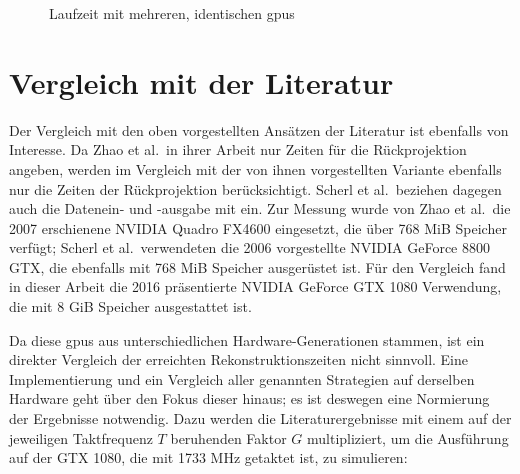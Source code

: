 \begin{figure}
    \centering
    \caption{Laufzeit mit mehreren, identischen \gls{gpu}s}
    \label{fig:laufzeit_gpus_homogen}
\end{figure}


\section{Vergleich mit der Literatur}

Der Vergleich mit den oben vorgestellten Ansätzen der Literatur ist ebenfalls von Interesse. Da Zhao et al.\ in ihrer
Arbeit nur Zeiten für die Rückprojektion angeben, werden im Vergleich mit der von ihnen vorgestellten Variante ebenfalls
nur die Zeiten der Rückprojektion berücksichtigt. Scherl et al.\ beziehen dagegen auch die Datenein- und -ausgabe mit
ein. Zur Messung wurde von Zhao et al.\ die 2007 erschienene NVIDIA Quadro FX4600 eingesetzt, die über 768 MiB Speicher
verfügt; Scherl et al.\ verwendeten die 2006 vorgestellte NVIDIA GeForce 8800 GTX, die ebenfalls mit 768 MiB Speicher
ausgerüstet ist. Für den Vergleich fand in dieser Arbeit die 2016 präsentierte NVIDIA GeForce GTX 1080 Verwendung, die
mit 8 GiB Speicher ausgestattet ist.

Da diese \gls{gpu}s aus unterschiedlichen Hardware-Generationen stammen, ist ein direkter Vergleich der erreichten
Rekonstruktionszeiten nicht sinnvoll. Eine Implementierung und ein Vergleich aller genannten Strategien auf derselben
Hardware geht über den Fokus dieser hinaus; es ist deswegen eine Normierung der Ergebnisse notwendig. Dazu werden die
Literaturergebnisse mit einem auf der jeweiligen Taktfrequenz $T$ beruhenden Faktor $G$ multipliziert, um die Ausführung
auf der GTX 1080, die mit 1733 MHz getaktet ist, zu simulieren:

